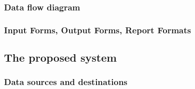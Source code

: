 \subsubsection{Data flow diagram}

\subsubsection{Input Forms, Output Forms, Report Formats}

\subsection{The proposed system}

\subsubsection{Data sources and destinations}

